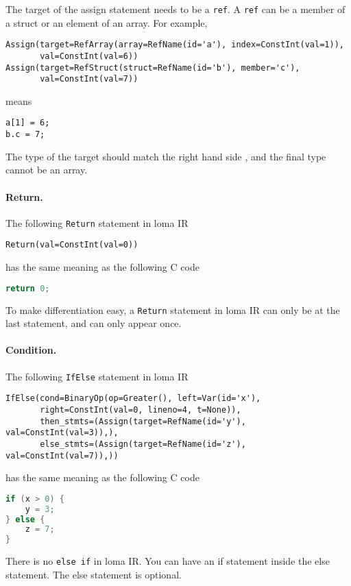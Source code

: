 The target of the assign statement needs to be a \lstinline{ref}. A \lstinline{ref} can be a member of a struct or an element of an array. For example,
\begin{lstlisting}
Assign(target=RefArray(array=RefName(id='a'), index=ConstInt(val=1)),
       val=ConstInt(val=6))
Assign(target=RefStruct(struct=RefName(id='b'), member='c'),
       val=ConstInt(val=7))
\end{lstlisting}
means
\begin{lstlisting}
a[1] = 6;
b.c = 7;
\end{lstlisting}

The type of the target should match the right hand side , and the final type cannot be an array.

\paragraph{Return.}
The following \lstinline{Return} statement in loma IR
\begin{lstlisting}
Return(val=ConstInt(val=0))
\end{lstlisting}
has the same meaning as the following C code
\begin{lstlisting}[language=c]
return 0;
\end{lstlisting}

To make differentiation easy, a \lstinline{Return} statement in loma IR can only be at the last statement, and can only appear once. 

\paragraph{Condition.}
The following \lstinline{IfElse} statement in loma IR
\begin{lstlisting}
IfElse(cond=BinaryOp(op=Greater(), left=Var(id='x'),
       right=ConstInt(val=0, lineno=4, t=None)),
       then_stmts=(Assign(target=RefName(id='y'), val=ConstInt(val=3)),),
       else_stmts=(Assign(target=RefName(id='z'), val=ConstInt(val=7)),))
\end{lstlisting}
has the same meaning as the following C code
\begin{lstlisting}[language=c]
if (x > 0) {
    y = 3;
} else {
    z = 7;
}
\end{lstlisting}

There is no \lstinline{else if} in loma IR. You can have an if statement inside the else statement. The else statement is optional.

